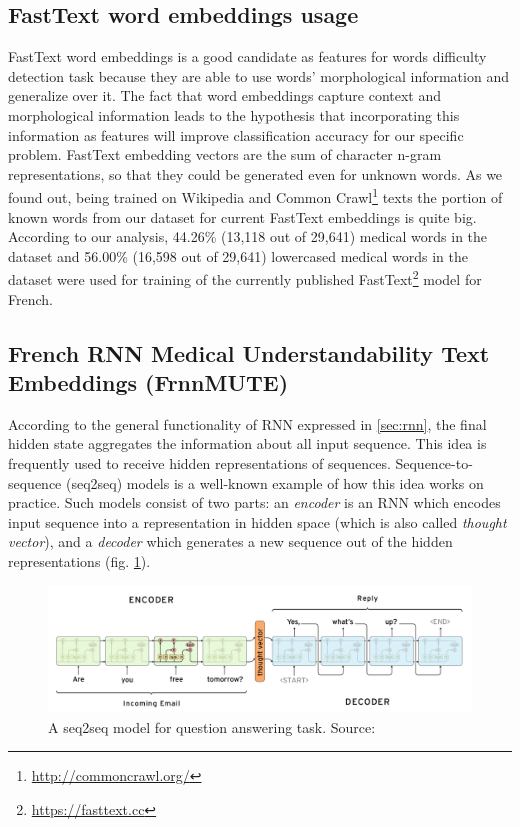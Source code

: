 \subsection{FastText word embeddings usage}

FastText word embeddings \cite{Bojanowski-ACL2017} is a good candidate as features for words difficulty detection task because they are able to use words' morphological information and generalize over it. The fact that word embeddings capture context and morphological information leads to the hypothesis that incorporating this information as features will improve classification accuracy for our specific problem. FastText embedding vectors are the sum of character n-gram representations, so that they could be generated even for unknown words. As we found out, being trained on Wikipedia and Common Crawl\footnote{\url{http://commoncrawl.org/}} texts the portion of known words from our dataset for current FastText embeddings is quite big. According to our analysis, 44.26\% (13,118 out of 29,641) medical words in the dataset and 56.00\% (16,598 out of 29,641) lowercased medical words in the dataset were used for training of the currently published FastText\footnote{\url{https://fasttext.cc}} model for French.

\subsection{French RNN Medical Understandability Text Embeddings (FrnnMUTE)}
According to the general functionality of RNN expressed in \ref{sec:rnn}, the final hidden state aggregates the information about all input sequence. This idea is frequently used to receive hidden representations of sequences. Sequence-to-sequence (seq2seq) models is a well-known example of how this idea works on practice. Such models consist of two parts: an \textit{encoder} is an RNN which encodes input sequence into a representation in hidden space (which is also called \textit{thought vector}), and a \textit{decoder} which generates a new sequence out of the hidden representations (fig. \ref{fig:seq2seq}). 

\begin{figure}[h]
    \centering
    \includegraphics[width=14cm]{Images/seq2seq.png}
    \caption{A seq2seq model for question answering task. Source: \citep{Britz-2016}}
    \label{fig:seq2seq}
\end{figure} 

